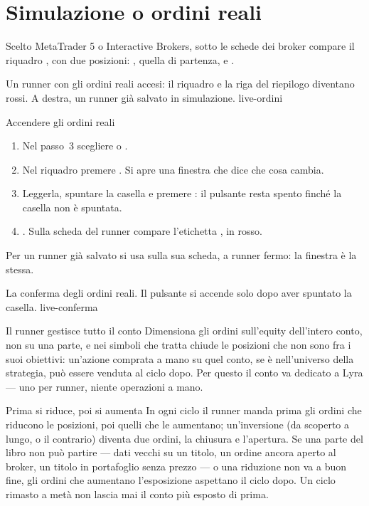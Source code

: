 \section{Simulazione o ordini reali}\label{sez:ordini-reali}

Scelto MetaTrader 5 o Interactive Brokers, sotto le schede dei broker
compare il riquadro , con due posizioni: ,
quella di partenza, e .

  {Un runner con gli ordini reali accesi: il riquadro  e la
   riga del riepilogo diventano rossi. A destra, un runner già salvato in
   simulazione.}
  {live-ordini}

\begin{pratica}{Accendere gli ordini reali}
\begin{enumerate}
  \item Nel passo~\num{3} scegliere  o
        .
  \item Nel riquadro  premere . Si apre una
        finestra che dice che cosa cambia.
  \item Leggerla, spuntare la casella e premere
        : il pulsante resta spento finché la
        casella non è spuntata.
  \item {}. Sulla scheda del runner compare l'etichetta
        , in rosso.
\end{enumerate}
Per un runner già salvato si usa  sulla
sua scheda, a runner fermo: la finestra è la stessa.
\end{pratica}

  {La conferma degli ordini reali. Il pulsante si accende solo dopo aver
   spuntato la casella.}
  {live-conferma}

\begin{attenzione}{Il runner gestisce tutto il conto}
Dimensiona gli ordini sull'equity dell'intero conto, non su una parte, e
nei simboli che tratta chiude le posizioni che non sono fra i suoi
obiettivi: un'azione comprata a mano su quel conto, se è nell'universo
della strategia, può essere venduta al ciclo dopo. Per questo il conto va
dedicato a Lyra --- uno per runner, niente operazioni a mano.
\end{attenzione}

\begin{nota}{Prima si riduce, poi si aumenta}
In ogni ciclo il runner manda prima gli ordini che riducono le posizioni,
poi quelli che le aumentano; un'inversione (da scoperto a lungo, o il
contrario) diventa due ordini, la chiusura e l'apertura. Se una parte del
libro non può partire --- dati vecchi su un titolo, un ordine ancora aperto
al broker, un titolo in portafoglio senza prezzo --- o una riduzione non va
a buon fine, gli ordini che aumentano l'esposizione aspettano il ciclo
dopo. Un ciclo rimasto a metà non lascia mai il conto più esposto di prima.
\end{nota}

